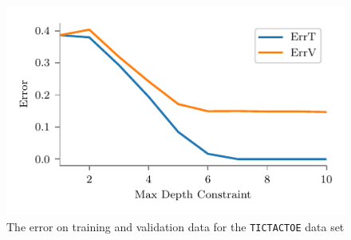 \documentclass[screen, authorversion, nonacm, sigconf]{acmart}
\begin{document}
\begin{figure}[H]
  \centering
  \includegraphics[width=\columnwidth]{figures/chart_errt_errv_tictactoe_ours.pdf}
  \caption{The error on training and validation data for the \texttt{TICTACTOE} data set}
  \label{fig:ttterrterrv}
\end{figure}
\end{document}
